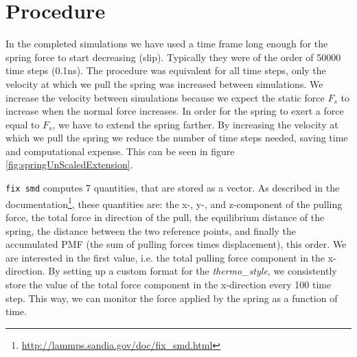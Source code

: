 \documentclass[twoside,english]{uiofysmaster}
\begin{document}
\section{Procedure}
In the completed simulations we have used a time frame long enough for the spring force to start decreasing (slip). Typically they were of the order of 50000 time steps (0.1ns).
The procedure was equivalent for all time steps, only the velocity at which we pull the spring was increased between simulations. 
We increase the velocity between simulations because we expect the static force $F_s$ to increase when the normal force increases.
In order for the spring to exert a force equal to $F_s$, we have to extend the spring farther. 
By increasing the velocity at which we pull the spring we reduce the number of time steps needed, saving time and computational expense.
This can be seen in figure \ref{fig:springUnScaledExtension}.

\texttt{fix smd} computes 7 quantities, that are stored as a vector. 
As described in the documentation\footnote{\href{http://lammps.sandia.gov/doc/fix_smd.html}{\url{http://lammps.sandia.gov/doc/fix_smd.html}}}, 
these quantities are:  the x-, y-, and z-component of the pulling force, the total force in direction of the pull, the equilibrium distance of the spring, the distance between the two reference points, and finally the accumulated PMF (the sum of pulling forces times displacement), this order.
We are interested in the first value, i.e. the total pulling force component in the x-direction.
By setting up a custom format for the \textit{thermo\_style}, we consistently store the value of the total force component in the x-direction every 100 time step. 
This way, we can monitor the force applied by the spring as a function of time.
\end{document}
